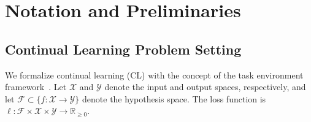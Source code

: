 \documentclass[letterpaper]{article} %
\begin{document}




\section{Notation and Preliminaries}

\subsection{Continual Learning Problem Setting }

We formalize continual learning (CL) with the concept of the task environment framework~\cite{pentinaPACBayesianBoundLifelong2014}. Let $\mathcal{X}$ and $\mathcal{Y}$ denote the input and output spaces, respectively, and let $\mathcal{F} \subset \{f : \mathcal{X} \rightarrow \mathcal{Y}\}$ denote the hypothesis space. The loss function is $\ell : \mathcal{F} \times \mathcal{X} \times \mathcal{Y} \rightarrow \mathbb{R}_{\geq 0}$.
\end{document}

